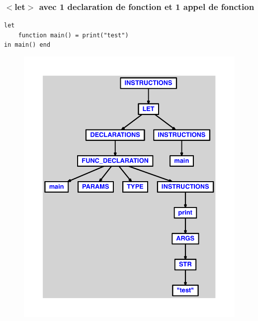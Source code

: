 \documentclass{article}
\begin{document}
\subsubsection{$ < $let$ > $ avec 1 declaration de fonction et 1 appel de fonction}
\begin{lstlisting}
let
	function main() = print("test")
in main() end
\end{lstlisting}
\newpage
\begin{figure}[H]
\centering
\includegraphics[max width=\textwidth]{ast/ast_272.pdf}
\end{figure}
\newpage
\end{document}
